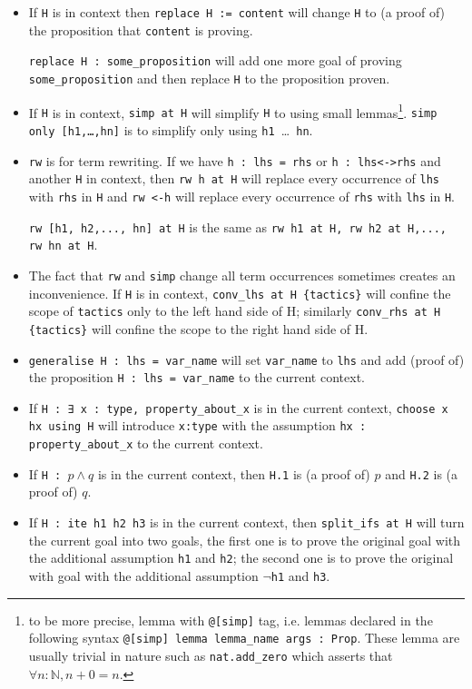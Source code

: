 \documentclass{report}
\theoremstyle{definition}
\begin{document}
\begin{itemize}
\begin{itemize}
    \item If {\tt \small H} is in context then {\tt \small replace H := content} will change {\tt \small H} to (a proof of) the proposition that {\tt \small content} is proving.
    
    {\tt \small replace H : some\_proposition} will add one more goal of proving {\tt \small some\_proposition} and then replace {\tt \small H} to the proposition proven.
    \item If {\tt \small H} is in context, {\tt \small simp at H} will simplify {\tt \small H} to using small lemmas\footnote{to be more precise, lemma with {\tt \scriptsize @[simp]} tag, i.e. lemmas declared in the following syntax {\tt \scriptsize @[simp] lemma lemma\_name args : Prop}. These lemma are usually trivial in nature such as {\tt \scriptsize nat.add\_zero} which asserts that $\forall n:\mathbb N, n + 0 = n$.}.
    {\tt \small simp only [h1,\dots,hn]} is to simplify only using {\tt \small h1 }\dots{\tt \small{ hn}}.
    \item {\tt \small rw} is for term rewriting. If we have {\tt \small h : lhs = rhs} or {\tt \small h : lhs<->rhs} and another {\tt \small H} in context, then {\tt \small rw h at H} will replace every occurrence of {\tt \small lhs} with {\tt \small rhs} in {\tt \small H} and {\tt \small rw <-h} will replace every occurrence of {\tt \small rhs} with {\tt \small lhs} in {\tt \small H}.
  
    {\tt \small rw [h1, h2,..., hn] at H} is the same as {\tt \small rw h1 at H, rw h2 at H,..., rw hn at H}.
    
    \item The fact that {\tt \small rw} and {\tt \small simp} change all term occurrences sometimes creates an inconvenience. If {\tt \small H} is in context, {\tt \small conv\_lhs at H \{tactics\}} will confine the scope of {\tt \small tactics} only to the left hand side of H; similarly {\tt \small conv\_rhs at H \{tactics\}} will confine the scope to the right hand side of H.

    \item {\tt \small generalise H : lhs = var\_name} will set {\tt \small var\_name} to {\tt \small lhs} and add (proof of) the proposition {\tt \small H : lhs = var\_name} to the current context.
    \item If {\tt \small H : ∃ x : type, property\_about\_x} is in the current context, {\tt \small choose x hx using H} will introduce {\tt \small x:type} with the assumption {\tt \small hx : property\_about\_x} to the current context. 
    \item If {\tt \small H : $p\land q$} is in the current context, then {\tt \small H.1} is (a proof of) $p$ and {\tt \small H.2} is (a proof of) $q$.
    \item If {\tt \small H : ite h1 h2 h3} is in the current context, then {\tt \small split\_ifs at H} will turn the current goal into two goals, the first one is to prove the original goal with the additional assumption {\tt \small h1} and {\tt \small h2}; the second one is to prove the original with goal with the additional assumption {\tt \small $\neg$h1} and {\tt \small h3}.
  \end{itemize}


\end{itemize}
\end{document}
